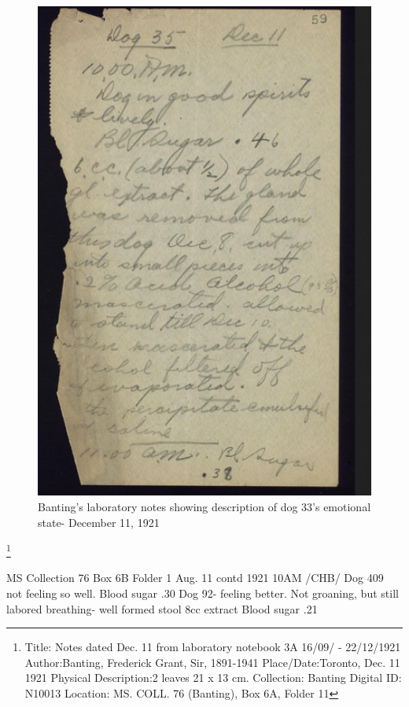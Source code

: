 \documentclass[12pt]{article}
\begin{document}
\begin{figure}[H]
\centering
 \includegraphics [width=5.5in]{Dog_lab}
  \caption{Banting's laboratory notes showing description of dog 33's emotional state- December 11, 1921}
  \label{fig:Dog 33 Laboratory Note}
\end{figure}\footnote{Title: Notes dated Dec. 11 from laboratory notebook 3A 16/09/ - 22/12/1921
Author:Banting, Frederick Grant, Sir, 1891-1941
Place/Date:Toronto, Dec. 11 1921
Physical Description:2 leaves 21 x 13 cm.
Collection: Banting
Digital ID: N10013
Location: MS. COLL. 76 (Banting), Box 6A, Folder 11}



MS Collection 76
Box 6B 
Folder 1
Aug. 11 contd 1921
10AM /CHB/
Dog 409 not feeling so well. Blood sugar .30
Dog 92- feeling better. Not groaning, but still labored breathing- well formed stool
8cc extract
Blood sugar .21
\end{document}
